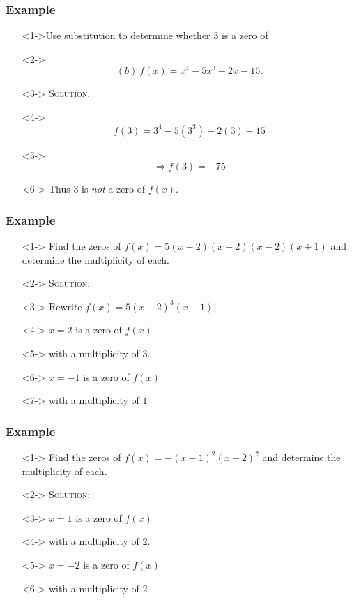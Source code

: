 \documentclass{beamer}
\begin{document}
\begin{frame}
  \frametitle{Example}
    \begin{enumerate}
      \item[]<1->Use substitution to determine whether $3$ is a zero of
      \item[]<2-> \[ (b)~f(x)=x^{4}-5x^{3}-2x-15. \]
      \item[]<3-> \textsc{Solution:}
      \item[]<4-> \[ f(3)=3^{4}-5(3^{3})-2(3)-15 \]
      \item[]<5-> \[ \Rightarrow f(3)=-75 \]
      \item[]<6-> Thus $3$ is \emph{not} a zero of $f(x)$.
    \end{enumerate}
\end{frame}

\begin{frame}
  \frametitle{Example}
    \begin{enumerate}
      \item[]<1-> Find the zeros of $f(x)=5(x-2)(x-2)(x-2)(x+1)$ and determine the multiplicity of each.
      \item[]<2-> \textsc{Solution:}
      \item[]<3-> Rewrite $f(x)=5(x-2)^{3}(x+1)$.
      \item[]<4-> $x=2$ is a zero of $f(x)$
      \item[]<5-> with a multiplicity of $3$.
      \item[]<6-> $x=-1$ is a zero of $f(x)$
      \item[]<7-> with a multiplicity of $1$
    \end{enumerate}
\end{frame}

\begin{frame}
  \frametitle{Example}
    \begin{enumerate}
      \item[]<1-> Find the zeros of $f(x)=-(x-1)^{2}(x+2)^{2}$ and determine the multiplicity of each.
      \item[]<2-> \textsc{Solution:}
      \item[]<3-> $x=1$ is a zero of $f(x)$
      \item[]<4-> with a multiplicity of $2$.
      \item[]<5-> $x=-2$ is a zero of $f(x)$
      \item[]<6-> with a multiplicity of $2$
    \end{enumerate}
\end{frame}
\end{document}
